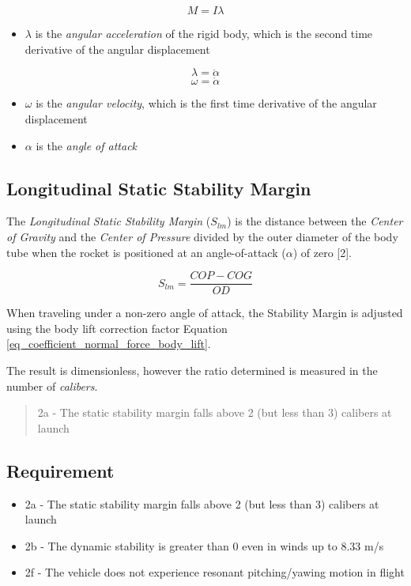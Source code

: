\documentclass[]{article}
\providecommand{\tightlist}{%
  \setlength{\itemsep}{0pt}\setlength{\parskip}{0pt}}
\begin{document}
\begin{equation}
\label{eq_moment}
M = I \lambda 
\end{equation}

\begin{itemize}
\tightlist
\item
  \(\lambda\) is the \emph{angular acceleration} of the rigid body,
  which is the second time derivative of the angular displacement
\end{itemize}

\[ 
\lambda = \ddot{\alpha}
\] \[
\omega = \dot{\alpha}
\]

\begin{itemize}
\tightlist
\item
  \(\omega\) is the \emph{angular velocity}, which is the first time
  derivative of the angular displacement
\item
  \(\alpha\) is the \emph{angle of attack}
\end{itemize}

\subsection{Longitudinal Static Stability
Margin}\label{longitudinal-static-stability-margin}

The \emph{Longitudinal Static Stability Margin} (\(S_{lm}\)) is the
distance between the \emph{Center of Gravity} and the \emph{Center of
Pressure} divided by the outer diameter of the body tube when the rocket
is positioned at an angle-of-attack (\(\alpha\)) of zero {[}2{]}.

\[ S_{lm} = \dfrac{COP - COG}{OD} \]

When traveling under a non-zero angle of attack, the Stability Margin is
adjusted using the body lift correction factor Equation
\ref{eq_coefficient_normal_force_body_lift}.

The result is dimensionless, however the ratio determined is measured in
the number of \emph{calibers}.

\begin{quote}
2a - The static stability margin falls above 2 (but less than 3)
calibers at launch
\end{quote}

\subsection{Requirement}\label{requirement}

\begin{itemize}
\tightlist
\item
  2a - The static stability margin falls above 2 (but less than 3)
  calibers at launch
\item
  2b - The dynamic stability is greater than 0 even in winds up to 8.33
  m/s
\item
  2f - The vehicle does not experience resonant pitching/yawing motion
  in flight
\end{itemize}
\end{document}
